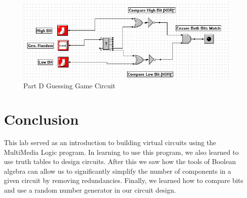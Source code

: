 \documentclass[a4paper,11pt]{article}
\begin{document}
\begin{figure}[h!]
   \centering
     \includegraphics[width=6.5in]{partd}
   \caption{Part D Guessing Game Circuit}
   \label{fig:partd}
\end{figure}   


\section{Conclusion}
This lab served as an introduction to building virtual circuits using the MultiMedia Logic program. In learning to use this program, we also learned to use truth tables to design circuits. After this we saw how the tools of Boolean algebra can allow us to significantly simplify the number of components in a given circuit by removing redundancies. Finally, we learned how to compare bits and use a random number generator in our circuit design. 
\end{document}
